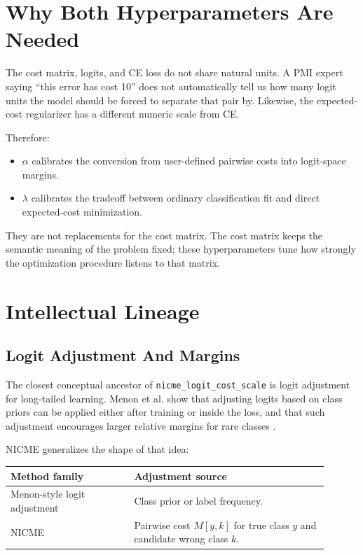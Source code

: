 \documentclass[11pt]{article}
\newcommand{\code}[1]{\texttt{#1}}
\begin{document}
\section{Why Both Hyperparameters Are Needed}

The cost matrix, logits, and CE loss do not share natural units.
A PMI expert saying ``this error has cost 10'' does not automatically tell us how many logit units the model should be forced to separate that pair by.
Likewise, the expected-cost regularizer has a different numeric scale from CE.

Therefore:

\begin{itemize}
  \item $\alpha$ calibrates the conversion from user-defined pairwise costs into logit-space margins.
  \item $\lambda$ calibrates the tradeoff between ordinary classification fit and direct expected-cost minimization.
\end{itemize}

They are not replacements for the cost matrix. The cost matrix keeps the semantic meaning of the problem fixed; these hyperparameters tune how strongly the optimization procedure listens to that matrix.

\section{Intellectual Lineage}

\subsection{Logit Adjustment And Margins}

The closest conceptual ancestor of \code{nicme\_logit\_cost\_scale} is logit adjustment for long-tailed learning.
Menon et al. show that adjusting logits based on class priors can be applied either after training or inside the loss, and that such adjustment encourages larger relative margins for rare classes \cite{menon2021logit}.

NICME generalizes the shape of that idea:

\begin{center}
\begin{tabular}{p{0.35\linewidth} p{0.55\linewidth}}
\toprule
Method family & Adjustment source \\
\midrule
Menon-style logit adjustment & Class prior or label frequency. \\
NICME & Pairwise cost $M[y,k]$ for true class $y$ and candidate wrong class $k$. \\
\bottomrule
\end{tabular}
\end{center}
\end{document}
